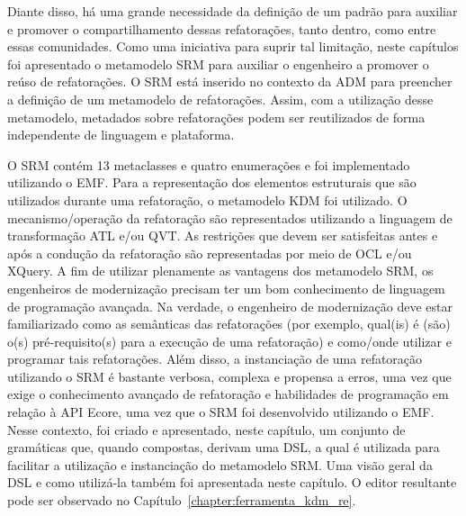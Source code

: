 Diante disso, há uma grande necessidade da definição de um padrão para auxiliar e promover o compartilhamento dessas refatorações, tanto dentro, como entre essas comunidades. Como uma iniciativa para suprir tal limitação, neste capítulos foi apresentado o metamodelo SRM para auxiliar o engenheiro a promover o reúso de refatorações. O SRM está inserido no contexto da ADM para preencher a definição de um metamodelo de refatorações. Assim, com a utilização desse metamodelo, metadados sobre refatorações podem ser reutilizados de forma independente de linguagem e plataforma.

O SRM contém 13 metaclasses e quatro enumerações e foi implementado utilizando o EMF. Para a representação dos elementos estruturais que são utilizados durante uma refatoração, o metamodelo KDM foi utilizado. O mecanismo/operação da refatoração são representados utilizando a linguagem de transformação ATL e/ou QVT. As restrições que devem ser satisfeitas antes e após a condução da refatoração são representadas por meio de OCL e/ou XQuery. A fim de utilizar plenamente as vantagens dos metamodelo SRM, os engenheiros de modernização precisam ter um bom conhecimento de linguagem de programação avançada. Na verdade, o engenheiro de modernização deve estar familiarizado como as semânticas das refatorações (por exemplo, qual(is) é (são) o(s) pré-requisito(s) para a execução de uma refatoração) e como/onde utilizar e programar tais refatorações. Além disso, a instanciação de uma refatoração utilizando o SRM é bastante verbosa, complexa e propensa a erros, uma vez que exige o conhecimento avançado de refatoração e habilidades de programação em relação à API Ecore, uma vez que o SRM foi desenvolvido utilizando o EMF. Nesse contexto, foi criado e apresentado, neste capítulo, um conjunto de gramáticas que, quando compostas, derivam uma DSL, a qual é utilizada para facilitar a utilização e instanciação do metamodelo SRM. Uma visão geral da DSL e como utilizá-la também foi apresentada neste capítulo. O editor resultante pode ser observado no Capítulo~\ref{chapter:ferramenta_kdm_re}. %

